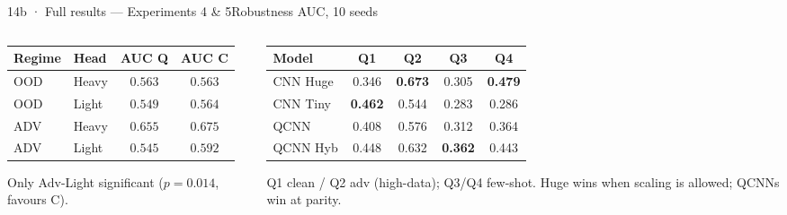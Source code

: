 \begin{frame}{14b · Full results --- Experiments 4 \& 5}{Robustness AUC, 10 seeds}
    \begin{columns}[T]
        \begin{column}{0.5\textwidth}
            \par
            \footnotesize
            \setlength{\tabcolsep}{3pt}
            \begin{tabular}{llcc}
                \toprule
                Regime & Head  & AUC Q   & AUC C            \\
                \midrule
                OOD    & Heavy & $0.563$ & $0.563$          \\
                OOD    & Light & $0.549$ & $0.564$          \\
                ADV    & Heavy & $0.655$ & $0.675$          \\
                ADV    & Light & $0.545$ & $\mathbf{0.592}$ \\
                \bottomrule
            \end{tabular}
            \par{\scriptsize\color{zhawgrey}Only Adv-Light significant ($p=0.014$,
                favours C).}
        \end{column}
        \begin{column}{0.5\textwidth}
            \par
            \footnotesize
            \setlength{\tabcolsep}{3pt}
            \begin{tabular}{lcccc}
                \toprule
                Model    & Q1             & Q2             & Q3             & Q4             \\
                \midrule
                CNN Huge & 0.346          & \textbf{0.673} & 0.305          & \textbf{0.479} \\
                CNN Tiny & \textbf{0.462} & 0.544          & 0.283          & 0.286          \\
                QCNN     & 0.408          & 0.576          & 0.312          & 0.364          \\
                QCNN Hyb & 0.448          & 0.632          & \textbf{0.362} & 0.443          \\
                \bottomrule
            \end{tabular}
            \par{\scriptsize\color{zhawgrey}Q1 clean / Q2 adv (high-data); Q3/Q4
                few-shot. Huge wins when scaling is allowed; QCNNs win at parity.}
        \end{column}
    \end{columns}
\end{frame}


